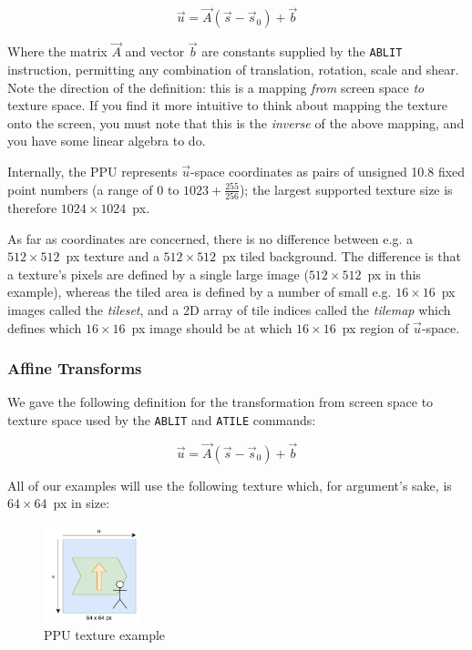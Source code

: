 \[
\vec{u} = \vec{A}(\vec{s} - \vec{s}_0) + \vec{b}
\]

Where the matrix $\vec{A}$ and vector $\vec{b}$ are constants supplied by the {\tt ABLIT} instruction, permitting any combination of translation, rotation, scale and shear. Note the direction of the definition: this is a mapping {\it from} screen space {\it to} texture space. If you find it more intuitive to think about mapping the texture onto the screen, you must note that this is the {\it inverse} of the above mapping, and you have some linear algebra to do.

Internally, the PPU represents $\vec{u}$-space coordinates as pairs of unsigned 10.8 fixed point numbers (a range of $0$ to $1023 + \frac{255}{256}$); the largest supported texture size is therefore $1024 \times 1024$~px.

As far as coordinates are concerned, there is no difference between e.g. a $512\times 512$~px texture and a $512\times 512$~px tiled background. The difference is that a texture's pixels are defined by a single large image ($512 \times 512$~px in this example), whereas the tiled area is defined by a number of small e.g. $16 \times 16$~px images called the {\it tileset}, and a 2D array of tile indices called the {\it tilemap} which defines which $16 \times 16$~px image should be at which $16 \times 16$~px region of $\vec{u}$-space.

\subsubsection*{Affine Transforms}
\label{section:affine_transform}

We gave the following definition for the transformation from screen space to texture space used by the {\tt ABLIT} and {\tt ATILE} commands:

\[
\vec{u} = \vec{A}(\vec{s} - \vec{s}_0) + \vec{b}
\]

All of our examples will use the following texture which, for argument's sake, is $64 \times 64$~px in size:

\begin{figure}[H]
\centering
\caption{PPU texture example}
\label{diagram:ppu_texture_example}
\includegraphics[width=0.25\textwidth]{diagrams/ppu_texture_example.pdf}
\end{figure}


